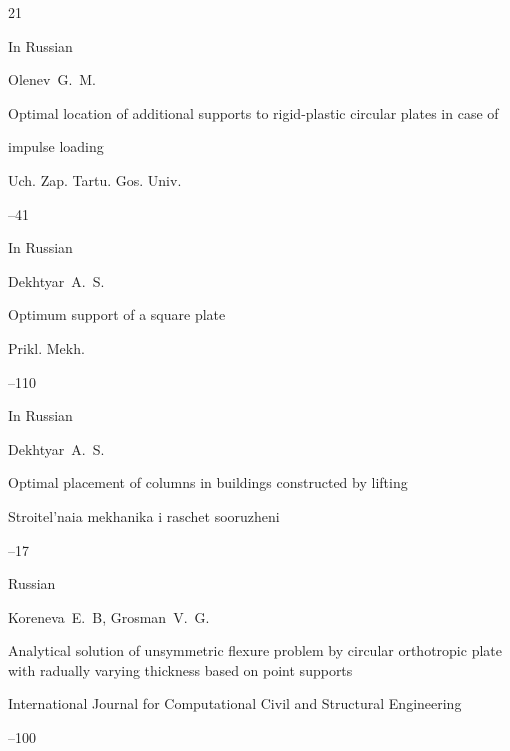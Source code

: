 \begin{thebibliography}{21}

\lang In Russian

\by Olenev~G.~M.

\paper Optimal location of additional supports to rigid-plastic circular plates in case of

impulse loading

\jour Uch. Zap. Tartu. Gos. Univ.



--41






\lang In Russian

\by Dekhtyar~A.~S.

\paper Optimum support of a square plate

\jour Prikl. Mekh.




--110








\lang In Russian

\by Dekhtyar~A.~S.

\paper Optimal placement of columns in buildings constructed by lifting

\jour Stroitel'naia mekhanika i raschet sooruzheni



--17






\lang Russian

\by Koreneva~E.~B, Grosman~V.~G.

\paper Analytical solution of unsymmetric flexure problem by circular orthotropic plate with radually varying thickness based on point supports

\jour International Journal for Computational Civil and Structural Engineering



--100






\end{thebibliography}
